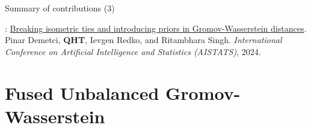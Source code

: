 \documentclass{beamer}
\begin{document}
\begin{frame}{Summary of contributions (3)}
  \scriptsize

  \vspace{-4cm}
  {}: \ul{Breaking isometric ties and introducing priors in Gromov-Wasserstein distances}.
  Pinar Demetci, \textbf{QHT}, Ievgen Redko, and Ritambhara Singh.
  \textit{International Conference on Artificial Intelligence and Statistics (AISTATS)}, 2024.

\end{frame}

\section{Fused Unbalanced Gromov-Wasserstein}
\end{document}
